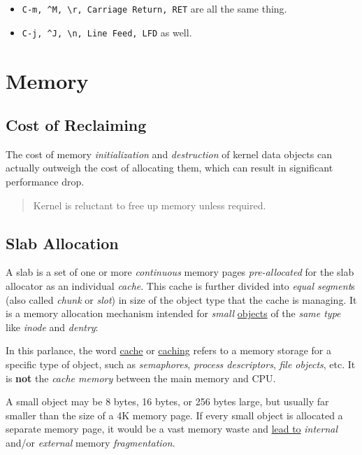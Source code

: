 \begin{itemize}
\item \verb|C-m, ^M, \r, Carriage Return, RET| are all the same
  thing.
\item \verb|C-j, ^J, \n, Line Feed, LFD| as well.
\end{itemize}

\section{Memory}
\label{sec:os-memory}

\subsection{Cost of Reclaiming}
\label{sec:cost-reclaiming}

The cost of memory \textit{initialization} and
\textit{destruction} of kernel data objects can actually outweigh
the cost of allocating them, which can result in significant
performance drop.

\begin{quotation}
  Kernel is reluctant to free up memory unless required.
\end{quotation}

\subsection{Slab Allocation}
\label{sec:slab-allocation}

A slab is a set of one or more \textit{continuous} memory pages
\textit{pre-allocated} for the slab allocator as an individual
\textit{cache}. This cache is further divided into \textit{equal
  segment}s (also called \textit{chunk} or \textit{slot}) in size
of the object type that the cache is managing. It is a memory
allocation mechanism intended for \textit{small} \uline{objects}
of the \textit{same type} like \textit{inode} and \textit{dentry}:

In this parlance, the word \uline{cache} or \uline{caching} refers
to a memory storage for a specific type of object, such as
\textit{semaphores}, \textit{process descriptors}, \textit{file
  objects}, etc. It is \textbf{not} the \textit{cache memory}
between the main memory and CPU.

A small object may be 8 bytes, 16 bytes, or 256 bytes large, but
usually far smaller than the size of a 4K memory page. If every
small object is allocated a separate memory page, it would be a
vast memory waste and
\href{https://stackoverflow.com/a/27762414}{lead to}
\textit{internal} and/or \textit{external} memory
\textit{fragmentation}.

